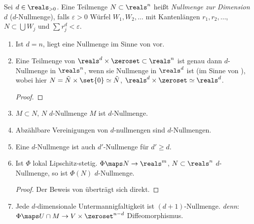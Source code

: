 \begin{definition}\label{d_nullmenge}
  Sei \( d\in \reals_{>0} \). Eine Teilmenge \( N\subset \reals^n \) heißt \emph{Nullmenge zur Dimension \( d \)} (\( d \)-Nullmenge), falls \tforall \( \varepsilon>0 \) \texists  Würfel \( W_1,W_2,\dotsc \) mit Kantenlängen \( r_1,r_2,\dotsc \),  \sd \( N\subset \bigcup W_j \) und \( \sum r_j^d<\varepsilon \).
\end{definition}
\begin{bemerkungen}
  \begin{enumerate}\label{d_nullmenge_eigenschaften}
    \item Ist \( d=n \), liegt eine Nullmenge im Sinne von  vor.
    \item Eine Teilmenge von \( \reals^d\times \zeroset \subset \reals^n \) ist genau dann \( d \)-Nullmenge in \( \reals^n \), wenn sie Nullmenge in \( \reals^d \) ist (im Sinne von ), wobei hier \( N=\tilde{N}\times \set{0}\simeq \tilde{N} \), \( \reals^d\times \zeroset \simeq \reals^d \).
    \begin{proof}
    \end{proof}
    \item \( M\subset N \), \( N \) \( d \)-Nullmenge \timplies \( M \) ist \( d \)-Nullmenge.
    \item Abzählbare Vereinigungen von \( d \)-nullmengen sind \( d \)-Nullmengen.
    \item Eine \( d \)-Nullmenge ist auch \( d' \)-Nullmenge für \( d'\geq d \).
    \item \label{d_nullmenge_eigenschaften:lipschitz_stetige_funktion_erhaelt_d_nullmenge}Ist \( \Phi \) lokal Lipschitz-stetig. \( \Phi\maps N\to \reals^m \), \( N\subset \reals^n \) \( d \)-Nullmenge, so ist \( \Phi(N) \) \( d\)-Nullmenge.
    \begin{proof}
      Der Beweis von  überträgt sich direkt.      
    \end{proof}
    \item \begin{folgerung*}
      Jede \( d \)-dimensionale Untermannigfaltigkeit ist \( (d+1) \)-Nullmenge. \emph{denn}: \texists \( \Phi\maps U\cap M\to V\times \zeroset^{n-d} \) Diffeomorphismus.
    \end{folgerung*}
  \end{enumerate}
\end{bemerkungen}
